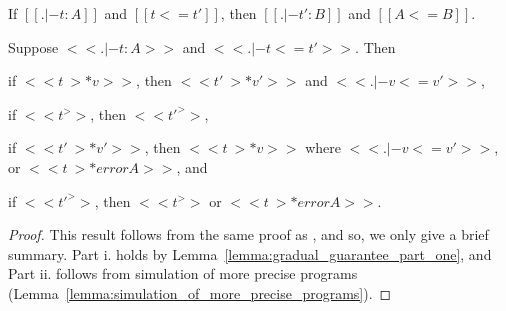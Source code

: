 \begin{theorem}
  \label{thm:gradual_guarantee} 
  \begin{enumR}
  \item[] 
  \item If $[[. |- t : A]]$ and $[[t <= t']]$, then $[[. |- t' : B]]$ and $[[A <= B]]$.
  \item Suppose $<<. |- t : A>>$ and $<<. |- t <= t'>>$. Then
    \begin{enumA}
    \item if $<<t ~>* v>>$, then $<<t' ~>* v'>>$ and $<<. |- v <= v'>>$,
    \item if $<<t ^>>$, then $<<t' ^>>$,
    \item if $<<t' ~>* v'>>$, then $<<t ~>* v>>$ where $<<. |- v <= v'>>$, or $<<t ~>* error A>>$, and
    \item if $<<t' ^>>$, then $<<t ^>>$ or $<<t ~>* error A>>$.
    \end{enumA}
  \end{enumR}
\end{theorem}
\begin{proof}
  This result follows from the same proof as \cite{Siek:2015}, and so,
  we only give a brief summary.  Part i. holds by
  Lemma~\ref{lemma:gradual_guarantee_part_one}, and Part ii. follows
  from simulation of more precise programs
  (Lemma~\ref{lemma:simulation_of_more_precise_programs}).
\end{proof}

